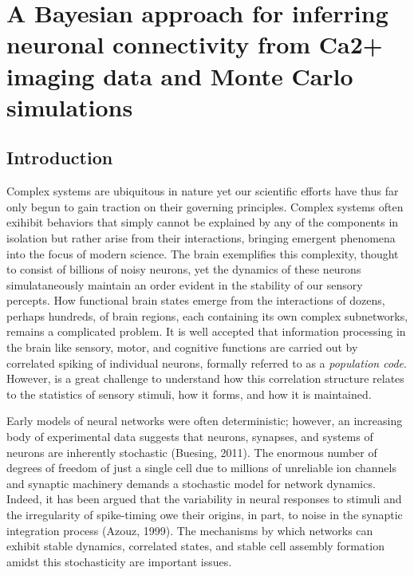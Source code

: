 \documentclass{ucetd}
\begin{document}
\chapter{A Bayesian approach for inferring neuronal connectivity from Ca2+ imaging data and Monte Carlo simulations}

\section{Introduction}

Complex systems are ubiquitous in nature yet our scientific efforts have thus far only begun to gain traction on their governing principles. Complex systems often exihibit behaviors that simply cannot be explained by any of the components in isolation but rather arise from their interactions, bringing emergent phenomena into the focus of modern science. The brain exemplifies this complexity, thought to consist of billions of noisy neurons, yet the dynamics of these neurons simulataneously maintain an order evident in the stability of our sensory percepts. How functional brain states emerge from the interactions of dozens, perhaps hundreds, of brain regions, each containing its own complex subnetworks, remains a complicated problem. It is well accepted that information processing in the brain like sensory, motor, and cognitive functions are carried out by correlated spiking of individual neurons, formally referred to as a \emph{population code}. However, is a great challenge to understand how this correlation structure relates to the statistics of sensory stimuli, how it forms, and how it is maintained. 

Early models of neural networks were often deterministic; however, an increasing body of experimental data suggests that neurons, synapses, and systems of neurons are inherently stochastic (Buesing, 2011). The enormous number of degrees of freedom of just a single cell due to millions of unreliable ion channels and synaptic machinery demands a stochastic model for network dynamics. Indeed, it has been argued that the variability in neural responses to stimuli and the irregularity of spike-timing owe their origins, in part, to noise in the synaptic integration process (Azouz, 1999). The mechanisms by which networks can exhibit stable dynamics, correlated states, and stable cell assembly formation amidst this stochasticity are important issues. 
\end{document}
